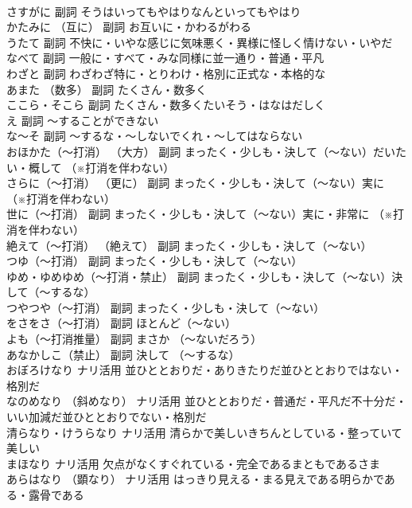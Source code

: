 \documentclass[8pt]{extreport}
\begin{document}
\begin{CJK}{UTF8}{min}
\\	さすがに		副詞	そうはいってもやはりなんといってもやはり
\\	かたみに	（互に）	副詞	お互いに・かわるがわる
\\	うたて		副詞	不快に・いやな感じに気味悪く・異様に怪しく情けない・いやだ
\\	なべて		副詞	一般に・すべて・みな同様に並一通り・普通・平凡
\\	わざと		副詞	わざわざ特に・とりわけ・格別に正式な・本格的な
\\	あまた	（数多）	副詞	たくさん・数多く
\\	ここら・そこら		副詞	たくさん・数多くたいそう・はなはだしく
\\	え		副詞	～することができない
\\	な～そ		副詞	～するな・～しないでくれ・～してはならない
\\	おほかた（～打消）	（大方）	副詞	まったく・少しも・決して（～ない）だいたい・概して （※打消を伴わない）
\\	さらに（～打消）	（更に）	副詞	まったく・少しも・決して（～ない）実に （※打消を伴わない）
\\	世に（～打消）		副詞	まったく・少しも・決して（～ない）実に・非常に （※打消を伴わない）
\\	絶えて（～打消）	（絶えて）	副詞	まったく・少しも・決して（～ない）
\\	つゆ（～打消）		副詞	まったく・少しも・決して（～ない）
\\	ゆめ・ゆめゆめ（～打消・禁止）		副詞	まったく・少しも・決して（～ない）決して（～するな）
\\	つやつや（～打消）		副詞	まったく・少しも・決して（～ない）
\\	をさをさ（～打消）		副詞	ほとんど（～ない）
\\	よも（～打消推量）		副詞	まさか （～ないだろう）
\\	あなかしこ（禁止）		副詞	決して （～するな）
\\	おぼろけなり		ナリ活用	並ひととおりだ・ありきたりだ並ひととおりではない・格別だ
\\	なのめなり	（斜めなり）	ナリ活用	並ひととおりだ・普通だ・平凡だ不十分だ・いい加減だ並ひととおりでない・格別だ
\\	清らなり・けうらなり		ナリ活用	清らかで美しいきちんとしている・整っていて美しい
\\	まほなり		ナリ活用	欠点がなくすぐれている・完全であるまともであるさま
\\	あらはなり	（顕なり）	ナリ活用	はっきり見える・まる見えである明らかである・露骨である

\end{CJK}
\end{document}

